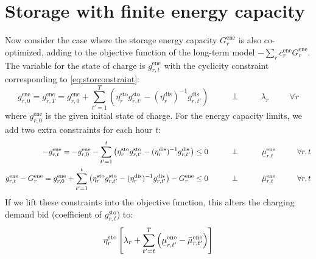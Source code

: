 \documentclass[final,3p]{elsarticle}
\def\l{\lambda} \def\K{\kappa} \def\m{\mu} \def\G{\Gamma} \def\d{\partial}
\begin{document}
\section*{Storage with finite energy capacity}

Now consider the case where the storage energy capacity $G^{\textrm{ene}}_r$ is
also co-optimized, adding to the objective function of the long-term model
$-\sum_r c^{\textrm{ene}}_r G^{\textrm{ene}}_r$. The variable for the state of
charge is $g^{\textrm{ene}}_{r,t}$ with the cyclicity constraint corresponding to
\eqref{eq:storconstraint}:
\begin{equation}
  g^{\textrm{ene}}_{r,0} = g^{\textrm{ene}}_{r,T} = g^{\textrm{ene}}_{r,0} + \sum_{t'=1}^T \left( \eta^{\textrm{sto}}_r g^{\textrm{sto}}_{r,t'} - (\eta^{\textrm{dis}}_r)^{-1} g^{\textrm{dis}}_{r,t'} \right)   \hspace{1cm}\perp \hspace{1cm} \lambda_{r} \hspace{1cm} \forall r
\end{equation}
where $g^{\textrm{ene}}_{r,0}$ is the given initial state of charge.
For the energy capacity limits, we add two extra constraints for each hour
$t$:
\begin{align}
  -g^{\textrm{ene}}_{r,t} =   -g^{\textrm{ene}}_{r,0} - \sum_{t'=1}^t \left( \eta^{\textrm{sto}}_r g^{\textrm{sto}}_{r,t'} - (\eta^{\textrm{dis}}_r)^{-1} g^{\textrm{dis}}_{r,t'} \right) \leq  0  \hspace{1cm}\perp \hspace{1cm} \ubar{\mu}^{\textrm{ene}}_{r,t} \hspace{1cm} \forall r,t \label{eq:enelower} \\
  g^{\textrm{ene}}_{r,t} - G^{\textrm{ene}}_r = g^{\textrm{ene}}_{r,0} + \sum_{t'=1}^t \left( \eta^{\textrm{sto}}_r g^{\textrm{sto}}_{r,t'} - (\eta^{\textrm{dis}}_r)^{-1} g^{\textrm{dis}}_{r,t'} \right) - G^{\textrm{ene}}_r \leq  0  \hspace{1cm}\perp \hspace{1cm} \bar{\mu}^{\textrm{ene}}_{r,t} \hspace{1cm} \forall r,t \label{eq:eneupper}
\end{align}
If we lift these constraints into the objective function, this alters the
charging demand bid (coefficient of  $g^{\textrm{sto}}_{r,t}$) to:
\begin{equation}
  \eta^{\textrm{sto}}_r \left[ \l_r + \sum_{t'=t}^T \left( \ubar{\mu}^{\textrm{ene}}_{r,t'} -\bar{\mu}^{\textrm{ene}}_{r,t'}  \right) \right]
\end{equation}
\end{document}
